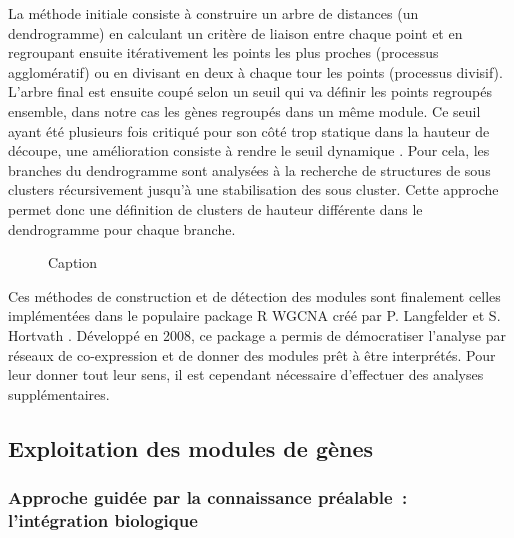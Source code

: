La méthode initiale \cite{Murtagh2012Jan} consiste à construire un arbre de distances (un dendrogramme) en calculant un critère de liaison entre chaque point et en regroupant ensuite itérativement les points les plus proches (processus agglomératif) ou en divisant en deux à chaque tour les points (processus divisif). L'arbre final est ensuite coupé selon un seuil qui va définir les points regroupés ensemble, dans notre cas les gènes regroupés dans un même module. Ce seuil ayant été plusieurs fois critiqué pour son côté trop statique dans la hauteur de découpe, une amélioration consiste à rendre le seuil dynamique \cite{Langfelder2008_cutree}. Pour cela, les branches du dendrogramme sont analysées à la recherche de structures de sous clusters récursivement jusqu'à une stabilisation des sous cluster. Cette approche permet donc une définition de clusters de hauteur différente dans le dendrogramme pour chaque branche.

\begin{figure}
    \centering
    \caption{Caption}
    \label{fig:my_label}
\end{figure}


Ces méthodes de construction et de détection des modules sont finalement celles implémentées dans le populaire package R WGCNA créé par P. Langfelder et S. Hortvath \cite{Langfelder2008}. Développé en 2008, ce package a permis de démocratiser l'analyse par réseaux de co-expression et de donner des modules prêt à être interprétés. Pour leur donner tout leur sens, il est cependant nécessaire d'effectuer des analyses supplémentaires.



\subsection{Exploitation des modules de gènes}


\subsubsection{Approche guidée par la connaissance préalable : l'intégration biologique}


